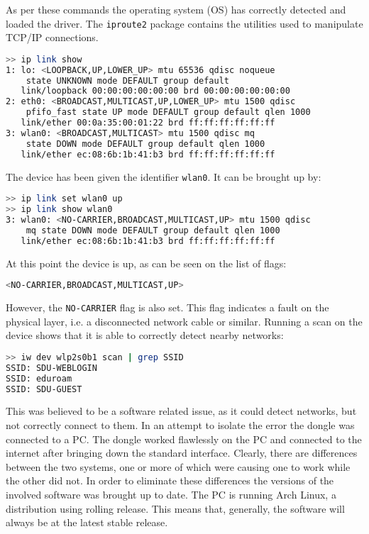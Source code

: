 As per these commands the operating system (OS) has correctly detected and loaded the driver.
The \texttt{iproute2} package contains the utilities used to manipulate TCP/IP connections.
\begin{lstlisting}[language=bash]
>> ip link show
1: lo: <LOOPBACK,UP,LOWER_UP> mtu 65536 qdisc noqueue 
	state UNKNOWN mode DEFAULT group default 
   link/loopback 00:00:00:00:00:00 brd 00:00:00:00:00:00
2: eth0: <BROADCAST,MULTICAST,UP,LOWER_UP> mtu 1500 qdisc 
	pfifo_fast state UP mode DEFAULT group default qlen 1000
   link/ether 00:0a:35:00:01:22 brd ff:ff:ff:ff:ff:ff
3: wlan0: <BROADCAST,MULTICAST> mtu 1500 qdisc mq 
	state DOWN mode DEFAULT group default qlen 1000
   link/ether ec:08:6b:1b:41:b3 brd ff:ff:ff:ff:ff:ff
\end{lstlisting}

The device has been given the identifier \texttt{wlan0}.
It can be brought up by:
\begin{lstlisting}[language=bash]
>> ip link set wlan0 up
>> ip link show wlan0
3: wlan0: <NO-CARRIER,BROADCAST,MULTICAST,UP> mtu 1500 qdisc 
	mq state DOWN mode DEFAULT group default qlen 1000
   link/ether ec:08:6b:1b:41:b3 brd ff:ff:ff:ff:ff:ff
\end{lstlisting}
At this point the device is up, as can be seen on the list of flags:
\begin{lstlisting}[language=bash]
<NO-CARRIER,BROADCAST,MULTICAST,UP>
\end{lstlisting}
However, the \texttt{NO-CARRIER} flag is also set.
This flag indicates a fault on the physical layer, i.e. a disconnected network cable or similar.
Running a scan on the device shows that it is able to correctly detect nearby networks:
\begin{lstlisting}[language=bash]
>> iw dev wlp2s0b1 scan | grep SSID
SSID: SDU-WEBLOGIN
SSID: eduroam
SSID: SDU-GUEST
\end{lstlisting}
This was believed to be a software related issue, as it could detect networks, but not correctly connect to them.
In an attempt to isolate the error the dongle was connected to a PC.
The dongle worked flawlessly on the PC and connected to the internet after bringing down the standard interface.
Clearly, there are differences between the two systems, one or more of which were causing one to work while the other did not.
In order to eliminate these differences the versions of the involved software was brought up to date.
The PC is running Arch Linux, a distribution using rolling release.
This means that, generally, the software will always be at the latest stable release.
